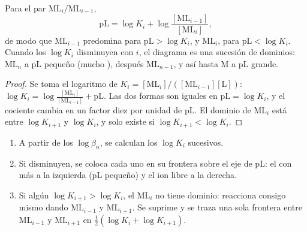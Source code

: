 \begin{proposition}[Fronteras en pL]\label{prop:b1:complexation:pl-boundaries}
Para el par $\mathrm{ML}_i/\mathrm{ML}_{i-1}$,
\[
  \mathrm{pL} = \log K_i + \log\frac{[\mathrm{ML}_{i-1}]}{[\mathrm{ML}_i]} ,
\]
de modo que $\mathrm{ML}_{i-1}$ predomina para $\mathrm{pL} > \log K_i$, y
$\mathrm{ML}_i$, para $\mathrm{pL} < \log K_i$. Cuando los $\log K_i$
disminuyen con $i$, el diagrama es una sucesión de dominios:
$\mathrm{ML}_n$ a pL pequeño (mucho ), después
$\mathrm{ML}_{n-1}$, y así hasta M a pL grande.
\end{proposition}

\begin{proof}
Se toma el logaritmo de $K_i = [\mathrm{ML}_i]/([\mathrm{ML}_{i-1}][\mathrm{L}])$:
$\log K_i = \log\frac{[\mathrm{ML}_i]}{[\mathrm{ML}_{i-1}]} + \mathrm{pL}$.
Las dos formas son iguales en $\mathrm{pL} = \log K_i$, y el cociente
cambia en un factor diez por unidad de pL. El dominio de $\mathrm{ML}_i$
está entre $\log K_{i+1}$ y $\log K_i$, y solo existe si $\log K_{i+1} < \log
K_i$.
\end{proof}

\begin{method}\label{met:b1:complexation:pl-diagram}
\begin{enumerate}
  \item A partir de los $\log\beta_n$, se calculan los $\log K_i$
        sucesivos.
  \item Si disminuyen, se coloca cada uno en su frontera sobre el eje de
        pL: el  con más  a la izquierda (pL pequeño) y el
        ion libre a la derecha.
  \item Si algún $\log K_{i+1} > \log K_i$, el  $\mathrm{ML}_i$ no
        tiene dominio: reacciona consigo mismo dando $\mathrm{ML}_{i-1}$ y
        $\mathrm{ML}_{i+1}$. Se suprime y se traza una sola frontera
        entre $\mathrm{ML}_{i-1}$ y $\mathrm{ML}_{i+1}$ en
        $\frac12(\log K_i + \log K_{i+1})$.
\end{enumerate}
\end{method}


